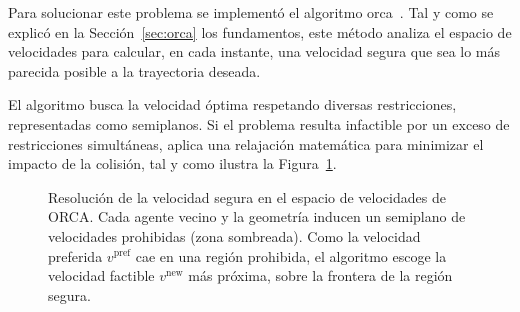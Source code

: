 Para solucionar este problema se implementó el algoritmo \acrshort{orca}~\cite{van2011reciprocal}.
Tal y como se explicó en la Sección~\ref{sec:orca} los fundamentos, este método analiza el espacio de velocidades para calcular, en cada instante, una velocidad segura que sea lo más parecida posible a la trayectoria deseada.

El algoritmo busca la velocidad óptima respetando diversas restricciones, representadas como semiplanos.
Si el problema resulta infactible por un exceso de restricciones simultáneas, aplica una relajación matemática para minimizar el impacto de la colisión, tal y como ilustra la Figura~\ref{fig:orca}.

\begin{figure}[htp]
  \centering
  \caption[Resolución de la velocidad segura en el espacio de velocidades de ORCA.]
  {Resolución de la velocidad segura en el espacio de velocidades de ORCA.
  Cada agente vecino y la geometría inducen un semiplano de velocidades prohibidas (zona sombreada).
  Como la velocidad preferida $v^{\mathrm{pref}}$ cae en una región prohibida, el algoritmo escoge la velocidad factible $v^{\mathrm{new}}$ más próxima, sobre la frontera de la región segura.}
  \label{fig:orca}
\end{figure}

